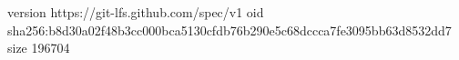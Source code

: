 version https://git-lfs.github.com/spec/v1
oid sha256:b8d30a02f48b3cc000bca5130cfdb76b290e5c68dccca7fe3095bb63d8532dd7
size 196704
